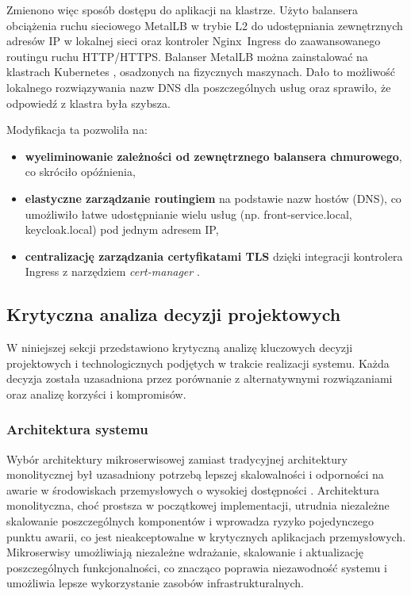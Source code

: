 {Zmienono więc sposób dostępu do aplikacji na klastrze. Użyto balansera obciążenia ruchu sieciowego \mbox{MetalLB} \cite{metallb_docs} w trybie L2 do udostępniania zewnętrznych adresów IP w lokalnej sieci oraz kontroler \mbox{Nginx Ingress} \cite{nginx_ingress_docs} do zaawansowanego routingu ruchu \mbox{HTTP/HTTPS}. Balanser \mbox{MetalLB} \cite{metallb_docs} można zainstalować na klastrach Kubernetes \cite{kubernetes}, osadzonych na fizycznych maszynach. Dało to możliwość lokalnego rozwiązywania nazw DNS dla poszczególnych usług oraz sprawiło, że odpowiedź z klastra była szybsza.

\newpage

Modyfikacja ta pozwoliła na:

\vspace{0.3em}

\begin{itemize}
    \item \textbf{wyeliminowanie zależności od zewnętrznego balansera chmurowego}, co skróciło opóźnienia,
    \item \textbf{elastyczne zarządzanie routingiem} na podstawie nazw hostów (DNS), co umożliwiło łatwe udostępnianie wielu usług (np. front-service.local, keycloak.local) pod jednym adresem IP,
    \item \textbf{centralizację zarządzania certyfikatami TLS} dzięki integracji kontrolera Ingress z narzędziem \textit{cert-manager} \cite{cert_manager_docs}.
\end{itemize}

\subsection{Krytyczna analiza decyzji projektowych}

W niniejszej sekcji przedstawiono krytyczną analizę kluczowych decyzji projektowych i technologicznych podjętych w trakcie realizacji systemu. Każda decyzja została uzasadniona przez porównanie z alternatywnymi rozwiązaniami oraz analizę korzyści i kompromisów.

\subsubsection{Architektura systemu}

Wybór architektury mikroserwisowej zamiast tradycyjnej architektury monolitycznej był uzasadniony potrzebą lepszej skalowalności i odporności na awarie w środowiskach przemysłowych o wysokiej dostępności \cite{microservice_benefits}. Architektura monolityczna, choć prostsza w początkowej implementacji, utrudnia niezależne skalowanie poszczególnych komponentów i wprowadza ryzyko pojedynczego punktu awarii, co jest nieakceptowalne w krytycznych aplikacjach przemysłowych. Mikroserwisy umożliwiają niezależne wdrażanie, skalowanie i aktualizację poszczególnych funkcjonalności, co znacząco poprawia niezawodność systemu i umożliwia lepsze wykorzystanie zasobów infrastrukturalnych.

}
